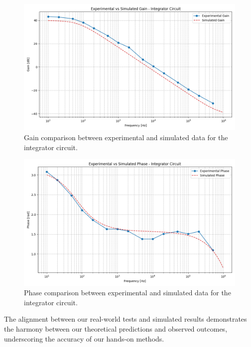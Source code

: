 		\begin{figure}[H]
		    \centering
		    \includegraphics[width=1\textwidth]{figures/integrator/gain_plot.png}
		    \caption{Gain comparison between experimental and simulated data for the integrator circuit.}
		    \label{fig:integrator_gain}
		\end{figure}

		\begin{figure}[H]
		    \centering
		    \includegraphics[width=1\textwidth]{figures/integrator/phase_plot.png}
		    \caption{Phase comparison between experimental and simulated data for the integrator circuit.}
		    \label{fig:integrator_phase}
		\end{figure} 

		The alignment between our real-world tests and simulated results demonstrates the harmony between our theoretical predictions and observed outcomes, 
		underscoring the accuracy of our hands-on methods.
